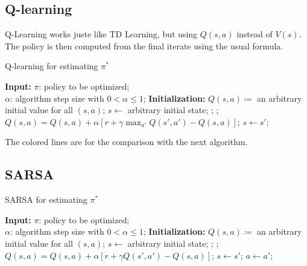 \documentclass[12pt, openany]{report}
\theoremstyle{definition}
\begin{document}
\subsection{Q-learning}
Q-Learning works juste like TD Learning, but using $Q(s,a)$ instead of $V(s)$. The policy is then computed from the final iterate using the usual formula.
\begin{algorithm}
	\caption{Q-learning for estimating $\pi^*$}
	\begin{algorithmic}[1]
		\State \textbf{Input: } $\pi$: policy to be optimized;\\
		\quad \: \qquad $\alpha$: algorithm step size with $0<\alpha \le 1$;
		\State \textbf{Initialization: } $Q(s,a)\coloneqq$ an arbitrary initial value for all $(s,a)$;
		\For {}
		\State $s\gets$ arbitrary initial state;
		\For {}
		\State {};
		\State {};
		\State \color{SkyBlue}$Q(s,a) = Q(s,a)+\alpha[r+\gamma \max_{a'}Q(s',a')-Q(s,a)]$\color{black};
		\State $s\gets s'$;
		\EndFor
		\EndWhile 
		\EndFor
	\end{algorithmic}
\end{algorithm}
The colored lines are for the comparison with the next algorithm.
\subsection{SARSA}
\begin{algorithm}
	\caption{SARSA for estimating $\pi^*$}
	\begin{algorithmic}[1]
		\State \textbf{Input: } $\pi$: policy to be optimized;\\
		\quad \: \qquad $\alpha$: algorithm step size with $0<\alpha \le 1$;
		\State \textbf{Initialization: } $Q(s,a)\coloneqq$ an arbitrary initial value for all $(s,a)$;
		\For {}
		\State $s\gets$ arbitrary initial state;
		\State {}
		\For {}
		\State {};
		\State {};
		\State \color{SkyBlue}$Q(s,a) = Q(s,a)+\alpha[r+\gamma Q(s',a')-Q(s,a)]$\color{black};
		\State $s\gets s'$;
		\State \color{red} $a\gets a'$\color{black};
		\EndFor
		\EndWhile 
		\EndFor
	\end{algorithmic}
\end{algorithm}
\end{document}
